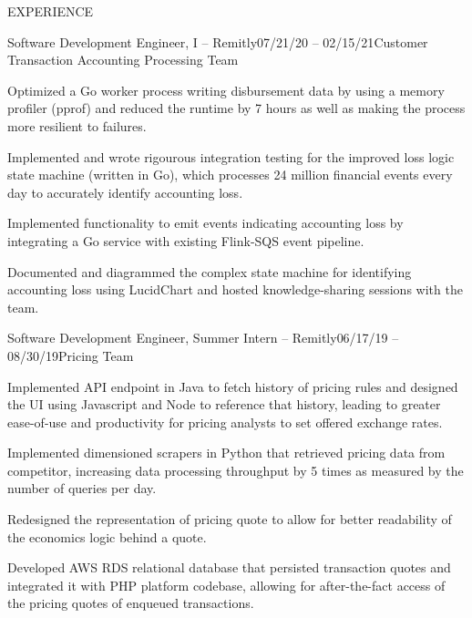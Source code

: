 \documentclass{resume} %
\begin{document}
\begin{rSection}{EXPERIENCE}
    \begin{rSubsection}{Software Development Engineer, I -- Remitly}{07/21/20 -- 02/15/21}{Customer Transaction Accounting Processing Team}{}
        \item Optimized a Go worker process writing disbursement data by using a memory profiler (pprof) and reduced the runtime by 7 hours as well as making the process more resilient to failures.
        \item Implemented and wrote rigourous integration testing for the improved loss logic state machine (written in Go), which processes 24 million financial events every day to accurately identify accounting loss.
        \item Implemented functionality to emit events indicating accounting loss by integrating a Go service with existing Flink-SQS event pipeline.
        \item Documented and diagrammed the complex state machine for identifying accounting loss using LucidChart and hosted knowledge-sharing sessions with the team.
    \end{rSubsection}
    \pagebreak
    \begin{rSubsection}{Software Development Engineer, Summer Intern -- Remitly}{06/17/19 -- 08/30/19}{Pricing Team}{}
        \item Implemented API endpoint in Java to fetch history of pricing rules and designed the UI using Javascript and Node to reference that history, leading to greater ease-of-use and productivity for pricing analysts to set offered exchange rates.
        \item Implemented dimensioned scrapers in Python that retrieved pricing data from competitor, increasing data processing throughput by 5 times as measured by the number of queries per day.
        \item Redesigned the representation of pricing quote to allow for better readability of the economics logic behind a quote.
        \item Developed AWS RDS relational database that persisted transaction quotes and integrated it with PHP platform codebase, allowing for after-the-fact access of the pricing quotes of enqueued transactions.
    \end{rSubsection}
\end{rSection}
\end{document}
